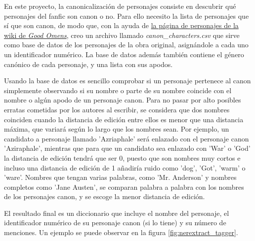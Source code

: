 \documentclass{pre-tfg}
\begin{document}
En este proyecto, la canonicalización de personajes consiste en descubrir qué personajes del fanfic son canon o no. Para ello necesito la lista de personajes que sí que son canon, de modo que, con la ayuda de \href{https://goodomens.fandom.com/wiki/Category:Characters}{la página de personajes de la wiki de \textit{Good Omens}}, creo un archivo llamado \textit{canon\_characters.csv} que sirve como base de datos de los personajes de la obra original, asignándole a cada uno un identificador numérico. La base de datos además también contiene el género canónico de cada personaje, y una lista con sus apodos.

Usando la base de datos es sencillo comprobar si un personaje pertenece al canon simplemente observando si su nombre o parte de su nombre coincide con el nombre o algún apodo de un personaje canon. Para no pasar por alto posibles erratas cometidas por los autores al escribir, se considera que dos nombres coinciden cuando la distancia de edición entre ellos es menor que una distancia máxima, que variará según lo largo que los nombres sean. Por ejemplo, un candidato a personaje llamado 'Azriaphale' será enlazado con el personaje canon 'Aziraphale', mientras que para que un candidato sea enlazado con 'War' o 'God' la distancia de edición tendrá que ser 0, puesto que son nombres muy cortos e incluso una distancia de edición de 1 añadiría ruido como 'dog', 'Got', 'warm' o 'ware'. Nombres que tengan varias palabras, como 'Mr. Anderson' y nombres completos como 'Jane Austen', se comparan palabra a palabra con los nombres de los personajes canon, y se escoge la menor distancia de edición.


El resultado final es un diccionario que incluye el nombre del personaje, el identificador numérico de su personaje canon (si lo tiene) y su número de menciones. Un ejemplo se puede observar en la figura \ref{fig:nerextract_tagger}.
\end{document}
